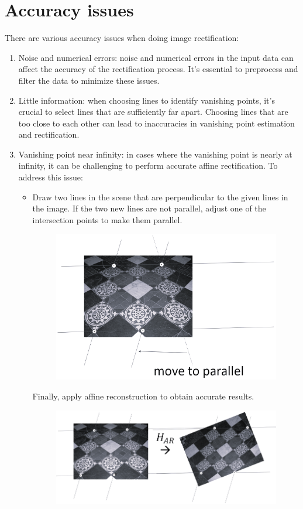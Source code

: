 \section{Accuracy issues}

There are various accuracy issues when doing image rectification: 
\begin{enumerate}
    \item Noise and numerical errors: noise and numerical errors in the input data can affect the accuracy of the rectification process. 
        It's essential to preprocess and filter the data to minimize these issues.
    \item Little information: when choosing lines to identify vanishing points, it's crucial to select lines that are sufficiently far apart. 
        Choosing lines that are too close to each other can lead to inaccuracies in vanishing point estimation and rectification.
    \item Vanishing point near infinity: in cases where the vanishing point is nearly at infinity, it can be challenging to perform accurate affine rectification. 
        To address this issue:
        \begin{itemize}
            \item Draw two lines in the scene that are perpendicular to the given lines in the image.
                If the two new lines are not parallel, adjust one of the intersection points to make them parallel.
                \begin{figure}[H]
                    \centering
                    \includegraphics[width=0.4\linewidth]{images/vpi.png}
                \end{figure}
                Finally, apply affine reconstruction to obtain accurate results. 
                \begin{figure}[H]
                    \centering
                    \includegraphics[width=0.5\linewidth]{images/ar.png}

\end{figure}
\end{itemize}
\end{enumerate}
